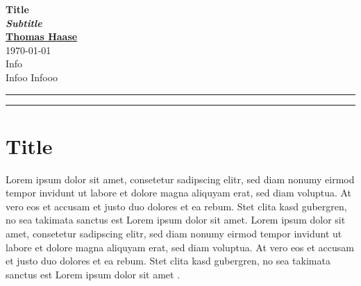 \documentclass[12pt, a4paper]{article}
\begin{document}
\begin{center}
    \Large{\textbf{Title\\ \textit{Subtitle}}}\\
\vspace{0.4cm}
\normalsize
    \underline{\textbf{Thomas Haase}} \\
\vspace{0.1cm}
    \today\\
\medskip
\small{Info}\\
\medskip\vspace{0,5cm}
\small{Infoo} \hspace*{3cm} \small{Infooo}\\
\medskip
    \normalsize
\end{center}
\medskip

{\color{gray}\hrule}

 \tableofcontents

\medskip

{\color{gray}\hrule}
\bigskip
\thispagestyle{empty}

\newpage
\setcounter{page}{1}

\section{Title}

Lorem ipsum dolor sit amet, consetetur sadipscing elitr, sed diam nonumy eirmod tempor invidunt ut labore et dolore magna aliquyam erat, sed diam voluptua. At vero eos et accusam et justo duo dolores et ea rebum. Stet clita kasd gubergren, no sea takimata sanctus est Lorem ipsum dolor sit amet. Lorem ipsum dolor sit amet, consetetur sadipscing elitr, sed diam nonumy eirmod tempor invidunt ut labore et dolore magna aliquyam erat, sed diam voluptua. At vero eos et accusam et justo duo dolores et ea rebum. Stet clita kasd gubergren, no sea takimata sanctus est Lorem ipsum dolor sit amet \parencite{adorno2003}.

%
%

\printbibliography
\end{document}

